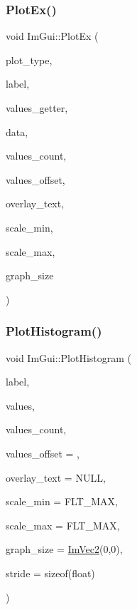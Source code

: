 \hypertarget{namespace_im_gui_a0a18ae07b294d5667f95a5c003d2efb6}{}\label{namespace_im_gui_a0a18ae07b294d5667f95a5c003d2efb6} 
\subsubsection{\texorpdfstring{Plot\+Ex()}{PlotEx()}}
{\footnotesize\ttfamily void Im\+Gui\+::\+Plot\+Ex (\begin{DoxyParamCaption}\item[{Im\+Gui\+Plot\+Type}]{plot\+\_\+type,  }\item[{const char $\ast$}]{label,  }\item[{float($\ast$)(void $\ast$data, int idx)}]{values\+\_\+getter,  }\item[{void $\ast$}]{data,  }\item[{int}]{values\+\_\+count,  }\item[{int}]{values\+\_\+offset,  }\item[{const char $\ast$}]{overlay\+\_\+text,  }\item[{float}]{scale\+\_\+min,  }\item[{float}]{scale\+\_\+max,  }\item[{\hyperlink{struct_im_vec2}{Im\+Vec2}}]{graph\+\_\+size }\end{DoxyParamCaption})}

\hypertarget{namespace_im_gui_af7a92b2118981835b5251bfdaac50252}{}\label{namespace_im_gui_af7a92b2118981835b5251bfdaac50252} 
\subsubsection{\texorpdfstring{Plot\+Histogram()}{PlotHistogram()}\hspace{0.1cm}{\footnotesize\ttfamily [1/2]}}
{\footnotesize\ttfamily void Im\+Gui\+::\+Plot\+Histogram (\begin{DoxyParamCaption}\item[{const char $\ast$}]{label,  }\item[{const float $\ast$}]{values,  }\item[{int}]{values\+\_\+count,  }\item[{int}]{values\+\_\+offset = {},  }\item[{const char $\ast$}]{overlay\+\_\+text = {\ttfamily NULL},  }\item[{float}]{scale\+\_\+min = {\ttfamily FLT\+\_\+MAX},  }\item[{float}]{scale\+\_\+max = {\ttfamily FLT\+\_\+MAX},  }\item[{\hyperlink{struct_im_vec2}{Im\+Vec2}}]{graph\+\_\+size = {\ttfamily \hyperlink{struct_im_vec2}{Im\+Vec2}(0,0)},  }\item[{int}]{stride = {\ttfamily sizeof(float)} }\end{DoxyParamCaption})}

